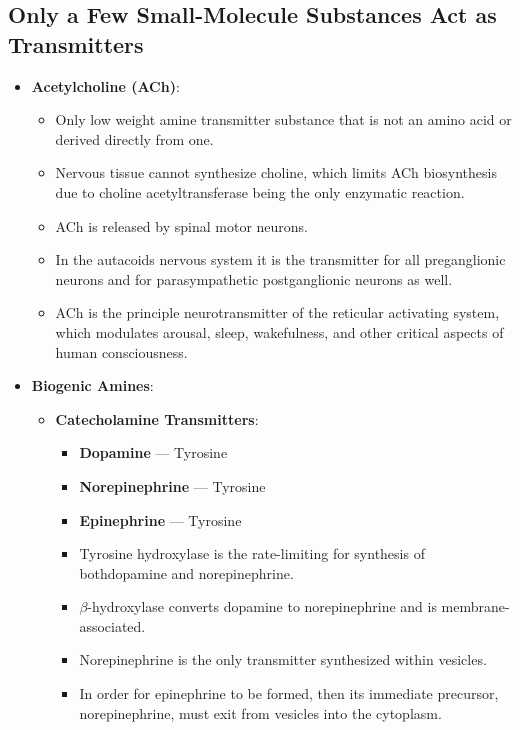 \documentclass[12pt,a4paper]{article}
\begin{document}
\subsection{Only a Few Small-Molecule Substances Act as Transmitters}
\begin{itemize}
    \item \textbf{Acetylcholine (ACh)}: 
        \begin{itemize}
            \item Only low weight amine transmitter substance that is not an amino acid or derived directly from one.
            \item Nervous tissue cannot synthesize choline, which limits ACh biosynthesis due to choline acetyltransferase being the only enzymatic reaction. 
            \item ACh is released by spinal motor neurons. 
            \item In the autacoids nervous system it is the transmitter for all preganglionic neurons and for parasympathetic postganglionic neurons as well.
            \item ACh is the principle neurotransmitter of the reticular activating system, which modulates arousal, sleep, wakefulness, and other critical aspects of human consciousness.
        \end{itemize}
    \item \textbf{Biogenic Amines}:
            \begin{itemize}
                \item \textbf{Catecholamine Transmitters}:
                    \begin{itemize}
                        \item \textbf{Dopamine} --- Tyrosine
                        \item \textbf{Norepinephrine} --- Tyrosine
                        \item \textbf{Epinephrine} --- Tyrosine
                        \item Tyrosine hydroxylase is the rate-limiting for synthesis of bothdopamine and norepinephrine.
                        \item $\beta$-hydroxylase converts dopamine to norepinephrine and is membrane-associated.
                        \item Norepinephrine is the only transmitter synthesized within vesicles.
                        \item In order for epinephrine to be formed, then its immediate precursor, norepinephrine, must exit from vesicles into the cytoplasm.

\end{itemize}
\end{itemize}
\end{itemize}
\end{document}
